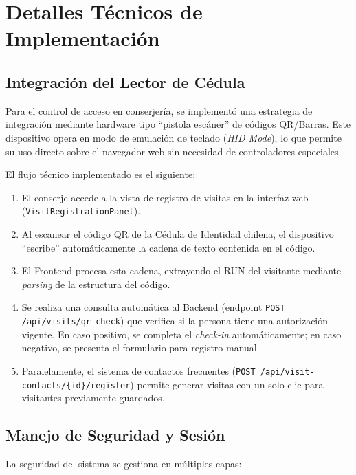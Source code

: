 \section{Detalles Técnicos de Implementación}

\subsection{Integración del Lector de Cédula}
Para el control de acceso en conserjería, se implementó una estrategia de integración mediante hardware tipo ``pistola escáner'' de códigos QR/Barras. Este dispositivo opera en modo de emulación de teclado (\textit{HID Mode}), lo que permite su uso directo sobre el navegador web sin necesidad de controladores especiales.

El flujo técnico implementado es el siguiente:
\begin{enumerate}
    \item El conserje accede a la vista de registro de visitas en la interfaz web (\texttt{VisitRegistrationPanel}).
    \item Al escanear el código QR de la Cédula de Identidad chilena, el dispositivo ``escribe'' automáticamente la cadena de texto contenida en el código.
    \item El Frontend procesa esta cadena, extrayendo el RUN del visitante mediante \textit{parsing} de la estructura del código.
    \item Se realiza una consulta automática al Backend (endpoint \texttt{POST /api/visits/qr-check}) que verifica si la persona tiene una autorización vigente. En caso positivo, se completa el \textit{check-in} automáticamente; en caso negativo, se presenta el formulario para registro manual.
    \item Paralelamente, el sistema de contactos frecuentes (\texttt{POST /api/visit-contacts/\{id\}/register}) permite generar visitas con un solo clic para visitantes previamente guardados.
\end{enumerate}

\subsection{Manejo de Seguridad y Sesión}
La seguridad del sistema se gestiona en múltiples capas:

